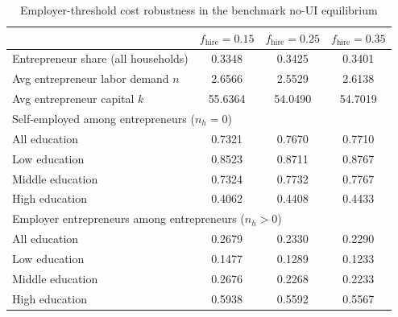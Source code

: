 \begin{table}[H]
\caption{Employer-threshold cost robustness in the benchmark no-UI equilibrium}
\label{tab:self_employment_fhire_robustness_noui}
\centering
\small
\begin{tabular}{|l|c|c|c|}
\hline
 & $f_{\mathrm{hire}}=0.15$ & $f_{\mathrm{hire}}=0.25$ & $f_{\mathrm{hire}}=0.35$ \\
\hline
Entrepreneur share (all households) & 0.3348 & 0.3425 & 0.3401 \\
\hline
Avg entrepreneur labor demand $n$ & 2.6566 & 2.5529 & 2.6138 \\
\hline
Avg entrepreneur capital $k$ & 55.6364 & 54.0490 & 54.7019 \\
\hline
\multicolumn{4}{|l|}{Self-employed among entrepreneurs ($n_h = 0$)} \\
\hline
All education & 0.7321 & 0.7670 & 0.7710 \\
\hline
Low education & 0.8523 & 0.8711 & 0.8767 \\
\hline
Middle education & 0.7324 & 0.7732 & 0.7767 \\
\hline
High education & 0.4062 & 0.4408 & 0.4433 \\
\hline
\multicolumn{4}{|l|}{Employer entrepreneurs among entrepreneurs ($n_h > 0$)} \\
\hline
All education & 0.2679 & 0.2330 & 0.2290 \\
\hline
Low education & 0.1477 & 0.1289 & 0.1233 \\
\hline
Middle education & 0.2676 & 0.2268 & 0.2233 \\
\hline
High education & 0.5938 & 0.5592 & 0.5567 \\
\hline
\end{tabular}
\end{table}
